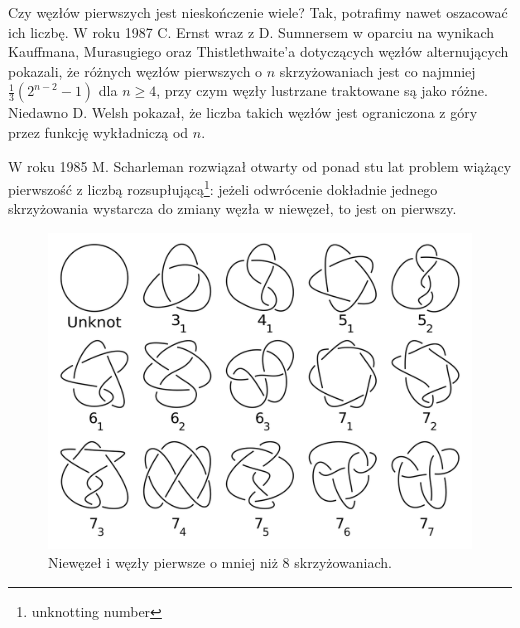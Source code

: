Czy węzłów pierwszych jest nieskończenie wiele?
Tak, potrafimy nawet oszacować ich liczbę.
W roku 1987 C. Ernst wraz z D. Sumnersem w oparciu na wynikach Kauffmana, Murasugiego oraz Thistlethwaite'a dotyczących węzłów alternujących pokazali, że różnych węzłów pierwszych o $n$ skrzyżowaniach jest co najmniej $\frac 1 3 (2^{n- 2} - 1)$ dla $n \ge 4$, przy czym węzły lustrzane traktowane są jako różne.
Niedawno D. Welsh pokazał, że liczba takich węzłów jest ograniczona z góry przez funkcję wykładniczą od $n$.


W roku 1985 M. Scharleman rozwiązał otwarty od ponad stu lat problem wiążący pierwszość z liczbą rozsupłującą\footnote{unknotting number}: jeżeli odwrócenie dokładnie jednego skrzyżowania wystarcza do zmiany węzła w niewęzeł, to jest on pierwszy.

\begin{figure}[!ht]
\centering
\includegraphics[scale=0.25]{4/knoty.png}
\caption{Niewęzeł i węzły pierwsze o mniej niż 8 skrzyżowaniach.}
\end{figure}